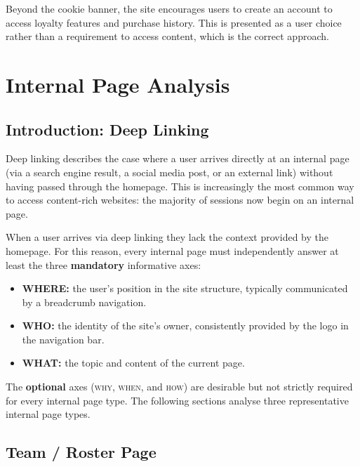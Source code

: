 \documentclass[12pt, a4paper]{article}
\begin{document}
Beyond the cookie banner, the site encourages users to create an account to access loyalty features and purchase history. This is presented as a user choice rather than a requirement to access content, which is the correct approach.

\newpage
\section{Internal Page Analysis}
\label{sec:internal}

\subsection{Introduction: Deep Linking}

Deep linking describes the case where a user arrives directly at an internal page (via a search engine result, a social media post, or an external link) without having passed through the homepage. This is increasingly the most common way to access content-rich websites: the majority of sessions now begin on an internal page.

When a user arrives via deep linking they lack the context provided by the homepage. For this reason, every internal page must independently answer at least the three \textbf{mandatory} informative axes:

\begin{itemize}[noitemsep]
  \item \textbf{WHERE:} the user's position in the site structure, typically communicated by a breadcrumb navigation.
  \item \textbf{WHO:} the identity of the site's owner, consistently provided by the logo in the navigation bar.
  \item \textbf{WHAT:} the topic and content of the current page.
\end{itemize}

The \textbf{optional} axes (\textsc{why}, \textsc{when}, and \textsc{how}) are desirable but not strictly required for every internal page type. The following sections analyse three representative internal page types.

\subsection{Team / Roster Page}
\end{document}
